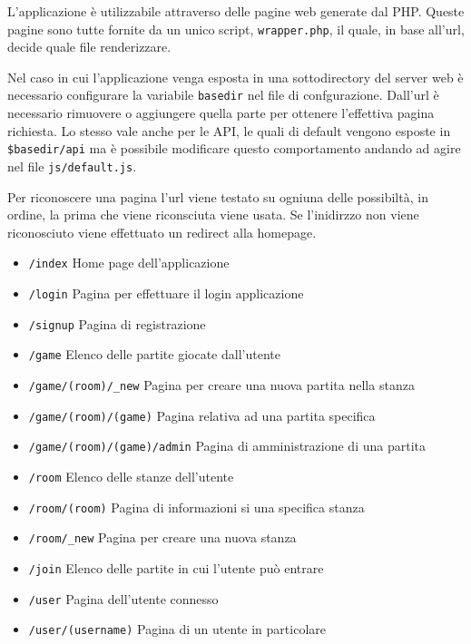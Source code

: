 L'applicazione è utilizzabile attraverso delle pagine web generate dal PHP. Queste pagine sono tutte fornite da un unico script, \texttt{wrapper.php}, il quale, in base all'url, decide quale file renderizzare.

Nel caso in cui l'applicazione venga esposta in una sottodirectory del server web è necessario configurare la variabile \texttt{basedir} nel file di confgurazione. Dall'url è necessario rimuovere o aggiungere quella parte per ottenere l'effettiva pagina richiesta. Lo stesso vale anche per le API, le quali di default vengono esposte in \texttt{\$basedir/api} ma è possibile modificare questo comportamento andando ad agire nel file \texttt{js/default.js}.

Per riconoscere una pagina l'url viene testato su ogniuna delle possibiltà, in ordine, la prima che viene riconsciuta viene usata. Se l'inidirzzo non viene riconosciuto viene effettuato un redirect alla homepage.

\begin{itemize}
	\item \texttt{/index} Home page dell'applicazione
	\item \texttt{/login} Pagina per effettuare il login applicazione
	\item \texttt{/signup} Pagina di registrazione
	\item \texttt{/game} Elenco delle partite giocate dall'utente
	\item \texttt{/game/(room)/\_new} Pagina per creare una nuova partita nella stanza
	\item \texttt{/game/(room)/(game)} Pagina relativa ad una partita specifica
	\item \texttt{/game/(room)/(game)/admin} Pagina di amministrazione di una partita
	\item \texttt{/room} Elenco delle stanze dell'utente
	\item \texttt{/room/(room)} Pagina di informazioni si una specifica stanza
	\item \texttt{/room/\_new} Pagina per creare una nuova stanza
	\item \texttt{/join} Elenco delle partite in cui l'utente può entrare
	\item \texttt{/user} Pagina dell'utente connesso
	\item \texttt{/user/(username)} Pagina di un utente in particolare
\end{itemize}
